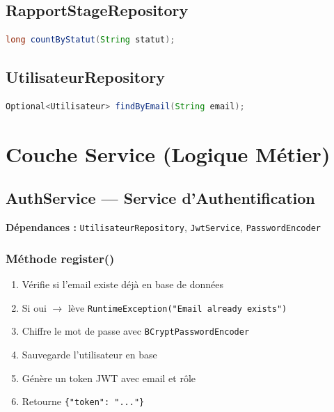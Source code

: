 \documentclass[12pt,a4paper]{report}
\begin{document}
\section{RapportStageRepository}

\begin{lstlisting}[language=Java, caption=RapportStageRepository]
long countByStatut(String statut);
\end{lstlisting}

\section{UtilisateurRepository}

\begin{lstlisting}[language=Java, caption=UtilisateurRepository]
Optional<Utilisateur> findByEmail(String email);
\end{lstlisting}

\chapter{Couche Service (Logique Métier)}

\section{AuthService --- Service d'Authentification}

\textbf{Dépendances :} \texttt{UtilisateurRepository}, \texttt{JwtService}, \texttt{PasswordEncoder}

\subsection{Méthode register()}

\begin{enumerate}
    \item Vérifie si l'email existe déjà en base de données
    \item Si oui $\rightarrow$ lève \texttt{RuntimeException("Email already exists")}
    \item Chiffre le mot de passe avec \texttt{BCryptPasswordEncoder}
    \item Sauvegarde l'utilisateur en base
    \item Génère un token JWT avec email et rôle
    \item Retourne \texttt{\{"token": "..."\}}
\end{enumerate}
\end{document}
